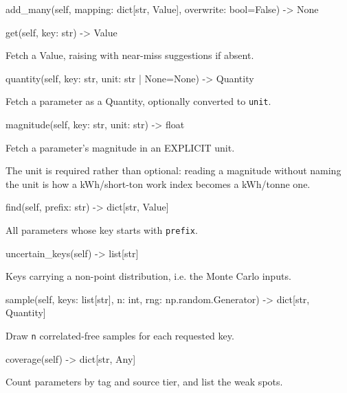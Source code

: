 \documentclass[10pt,a4paper,twoside]{report}
\begin{document}
\begin{verbatimsmall}
add_many(self, mapping: dict[str, Value], overwrite: bool=False) -> None
\end{verbatimsmall}

\begin{verbatimsmall}
get(self, key: str) -> Value
\end{verbatimsmall}

Fetch a Value, raising with near-miss suggestions if absent.

\begin{verbatimsmall}
quantity(self, key: str, unit: str | None=None) -> Quantity
\end{verbatimsmall}

Fetch a parameter as a Quantity, optionally converted to \texttt{unit}.

\begin{verbatimsmall}
magnitude(self, key: str, unit: str) -> float
\end{verbatimsmall}

Fetch a parameter's magnitude in an EXPLICIT unit.

The unit is required rather than optional: reading a magnitude without naming the unit is how a kWh/short-ton work index becomes a kWh/tonne one.

\begin{verbatimsmall}
find(self, prefix: str) -> dict[str, Value]
\end{verbatimsmall}

All parameters whose key starts with \texttt{prefix}.

\begin{verbatimsmall}
uncertain_keys(self) -> list[str]
\end{verbatimsmall}

Keys carrying a non-point distribution, i.e. the Monte Carlo inputs.

\begin{verbatimsmall}
sample(self, keys: list[str], n: int, rng: np.random.Generator) -> dict[str, Quantity]
\end{verbatimsmall}

Draw \texttt{n} correlated-free samples for each requested key.

\begin{verbatimsmall}
coverage(self) -> dict[str, Any]
\end{verbatimsmall}

Count parameters by tag and source tier, and list the weak spots.
\end{document}
